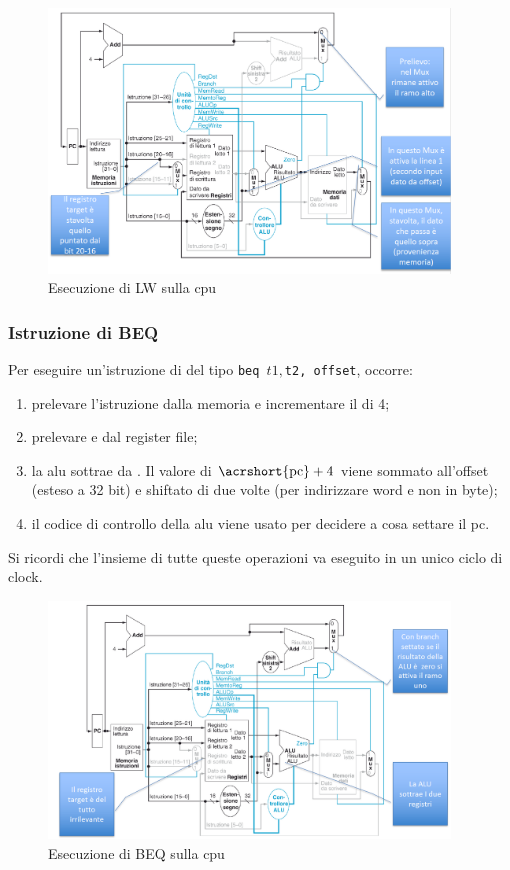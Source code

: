 \documentclass[class=book, crop=false, oneside]{standalone}
\begin{document}
\begin{figure}[H]
	\centering
	\includegraphics[width=0.95\textwidth,keepaspectratio]{es_lw.png}
	\caption{Esecuzione di LW sulla \acrshort{cpu}}
\end{figure}

\subsubsection{Istruzione di BEQ}
Per eseguire un'istruzione di  del tipo \texttt{beq $t1, $t2, offset}, occorre:
\begin{enumerate}
	\item prelevare l’istruzione dalla memoria e incrementare il  di 4;
	\item prelevare  e  dal register file;
	\item la \acrshort{alu} sottrae  da . Il valore di \(\textrm{\acrshort{pc}}+4\) viene sommato all’offset (esteso a 32 bit) e shiftato di due volte (per indirizzare word e non in byte);
	\item il codice di controllo  della \acrshort{alu} viene usato per decidere a cosa settare il \acrshort{pc}.
\end{enumerate}
Si ricordi che l'insieme di tutte queste operazioni va eseguito in un unico ciclo di clock.

\begin{figure}[H]
	\centering
	\includegraphics[width=0.95\textwidth,keepaspectratio]{es_beq.png}
	\caption{Esecuzione di BEQ sulla \acrshort{cpu}}
\end{figure}
\end{document}
